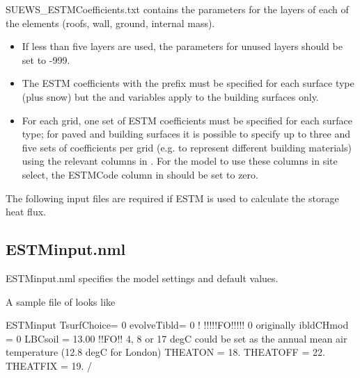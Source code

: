 \documentclass[letterpaper,10pt,english]{sphinxmanual}
\begin{document}
SUEWS\_ESTMCoefficients.txt contains the parameters for the layers of
each of the elements (roofs, wall, ground, internal mass).
\begin{itemize}
\item {} 
If less than five layers are used, the parameters for unused layers
should be set to -999.

\item {} 
The ESTM coefficients with the prefix  must be specified for
each surface type (plus snow) but the  and 
variables apply to the building surfaces only.

\item {} 
For each grid, one set of ESTM coefficients must be specified for
each surface type; for paved and building surfaces it is possible to
specify up to three and five sets of coefficients per grid (e.g. to
represent different building materials) using the relevant columns in
{\hyperref[\detokenize{input_files/SUEWS_SiteInfo/SUEWS_SiteSelect:suews-siteselect-txt}]{}}. For the model to
use these columns in site select, the ESTMCode column in
{\hyperref[\detokenize{input_files/SUEWS_SiteInfo/SUEWS_NonVeg:suews-nonveg-txt}]{}} should be set to zero.

\end{itemize}


The following input files are required if ESTM is used to calculate the
storage heat flux.


\subsection{ESTMinput.nml}
\label{\detokenize{input_files/ESTM_related_files/ESTM_related_files:estminput-nml}}
ESTMinput.nml specifies the model settings and default values.

A sample file of  looks like

%
\begin{sphinxVerbatim}[commandchars=\\\{\}]
\PYGZam{}ESTMinput
TsurfChoice= 0
evolveTibld= 0      ! !!!!!FO!!!!! 0 originally
ibldCHmod  = 0
LBC\PYGZus{}soil   = 13.00             !!FO!! 4, 8 or 17 degC \PYGZhy{} could be set as the annual mean air temperature (12.8 degC for London)
THEAT\PYGZus{}ON   = 18.
THEAT\PYGZus{}OFF  = 22.
THEAT\PYGZus{}FIX  = 19.
/
\end{sphinxVerbatim}
\end{document}
